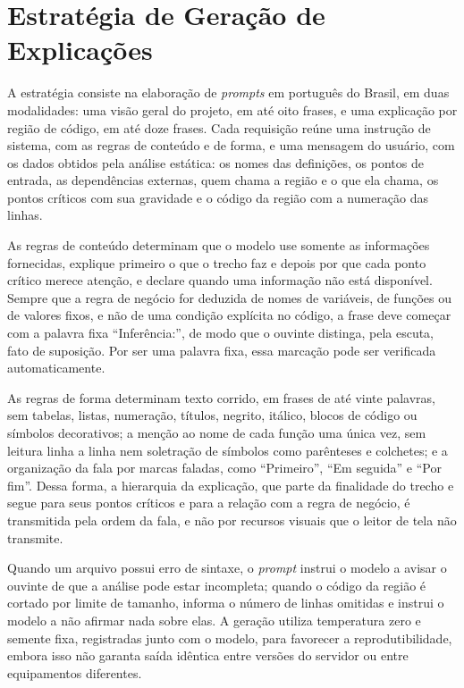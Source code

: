 \documentclass[
    12pt,                   %
    openright,              %
    oneside,                %
    a4paper,                %
    sumario=tradicional,    %
    english,                %
    brazil,                 %
    ]{abntex2}
\begin{document}
\section{Estratégia de Geração de Explicações}\label{sec:estrategia}

A estratégia consiste na elaboração de \textit{prompts} em português do Brasil, em duas modalidades: uma visão geral do projeto, em até oito frases, e uma explicação por região de código, em até doze frases. Cada requisição reúne uma instrução de sistema, com as regras de conteúdo e de forma, e uma mensagem do usuário, com os dados obtidos pela análise estática: os nomes das definições, os pontos de entrada, as dependências externas, quem chama a região e o que ela chama, os pontos críticos com sua gravidade e o código da região com a numeração das linhas.

As regras de conteúdo determinam que o modelo use somente as informações fornecidas, explique primeiro o que o trecho faz e depois por que cada ponto crítico merece atenção, e declare quando uma informação não está disponível. Sempre que a regra de negócio for deduzida de nomes de variáveis, de funções ou de valores fixos, e não de uma condição explícita no código, a frase deve começar com a palavra fixa \enquote{Inferência:}, de modo que o ouvinte distinga, pela escuta, fato de suposição. Por ser uma palavra fixa, essa marcação pode ser verificada automaticamente.

As regras de forma determinam texto corrido, em frases de até vinte palavras, sem tabelas, listas, numeração, títulos, negrito, itálico, blocos de código ou símbolos decorativos; a menção ao nome de cada função uma única vez, sem leitura linha a linha nem soletração de símbolos como parênteses e colchetes; e a organização da fala por marcas faladas, como \enquote{Primeiro}, \enquote{Em seguida} e \enquote{Por fim}. Dessa forma, a hierarquia da explicação, que parte da finalidade do trecho e segue para seus pontos críticos e para a relação com a regra de negócio, é transmitida pela ordem da fala, e não por recursos visuais que o leitor de tela não transmite.

Quando um arquivo possui erro de sintaxe, o \textit{prompt} instrui o modelo a avisar o ouvinte de que a análise pode estar incompleta; quando o código da região é cortado por limite de tamanho, informa o número de linhas omitidas e instrui o modelo a não afirmar nada sobre elas. A geração utiliza temperatura zero e semente fixa, registradas junto com o modelo, para favorecer a reprodutibilidade, embora isso não garanta saída idêntica entre versões do servidor ou entre equipamentos diferentes.
\end{document}
